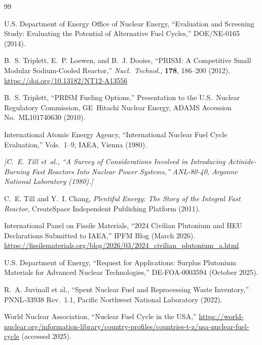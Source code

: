\documentclass[10pt,twoside]{article}
\newcommand{\placeholder}[1]{%
  \textcolor{placeholder}{\textit{[#1]}}}
\begin{document}
\begingroup
\small
\setlength{\bibsep}{2pt}
\renewcommand{\bibfont}{\small}

\begin{thebibliography}{99}

U.S. Department of Energy Office of Nuclear Energy,
``Evaluation and Screening Study: Evaluating the Potential of Alternative
Fuel Cycles,''
DOE/NE-0165 (2014).

B.~S. Triplett, E.~P. Loewen, and B.~J. Dooies,
``PRISM: A Competitive Small Modular Sodium-Cooled Reactor,''
\textit{Nucl.\ Technol.}, \textbf{178}, 186--200 (2012).
\href{https://doi.org/10.13182/NT12-A13556}{https://doi.org/10.13182/NT12-A13556}

B.~S. Triplett,
``PRISM Fueling Options,''
Presentation to the U.S.\ Nuclear Regulatory Commission,
GE~Hitachi Nuclear Energy, ADAMS Accession No.\ ML101740630
(2010).

International Atomic Energy Agency,
``International Nuclear Fuel Cycle Evaluation,'' Vols.\ 1--9,
IAEA, Vienna (1980).

\placeholder{C.~E. Till et~al.,
``A Survey of Considerations Involved in Introducing Actinide-Burning
Fast Reactors Into Nuclear Power Systems,''
ANL-80-40, Argonne National Laboratory (1980).}

C.~E. Till and Y.~I. Chang,
\textit{Plentiful Energy: The Story of the Integral Fast Reactor},
CreateSpace Independent Publishing Platform (2011).

International Panel on Fissile Materials,
``2024 Civilian Plutonium and HEU Declarations Submitted to IAEA,''
IPFM Blog (March 2026).
\url{https://fissilematerials.org/blog/2026/03/2024_civilian_plutonium_a.html}

U.S. Department of Energy,
``Request for Applications: Surplus Plutonium Materials for Advanced Nuclear
Technologies,'' DE-FOA-0003594 (October 2025).

R.~A. Juvinall et al.,
``Spent Nuclear Fuel and Reprocessing Waste Inventory,''
PNNL-33938 Rev.~1.1, Pacific Northwest National Laboratory (2022).

World Nuclear Association,
``Nuclear Fuel Cycle in the USA,''
\url{https://world-nuclear.org/information-library/country-profiles/countries-t-z/usa-nuclear-fuel-cycle}
(accessed 2025).


\end{thebibliography}
\end{document}
